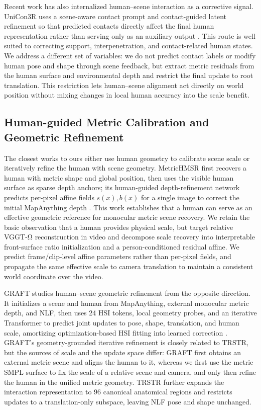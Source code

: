 \documentclass{article}
\begin{document}
Recent work has also internalized human--scene interaction as a corrective signal. UniCon3R uses a scene-aware contact prompt and contact-guided latent refinement so that predicted contacts directly affect the final human representation rather than serving only as an auxiliary output \citep{sur2026unicon3r}. This route is well suited to correcting support, interpenetration, and contact-related human states. We address a different set of variables: we do not predict contact labels or modify human pose and shape through scene feedback, but extract metric residuals from the human surface and environmental depth and restrict the final update to root translation. This restriction lets human--scene alignment act directly on world position without mixing changes in local human accuracy into the scale benefit.

\subsection{Human-guided Metric Calibration and Geometric Refinement}

The closest works to ours either use human geometry to calibrate scene scale or iteratively refine the human with scene geometry. MetricHMSR first recovers a human with metric shape and global position, then uses the visible human surface as sparse depth anchors; its human-guided depth-refinement network predicts per-pixel affine fields $s(x),b(x)$ for a single image to correct the initial MapAnything depth \citep{song2026metrichmsr,keetha2025mapanything}. This work establishes that a human can serve as an effective geometric reference for monocular metric scene recovery. We retain the basic observation that a human provides physical scale, but target relative VGGT-Ω reconstruction in video and decompose scale recovery into interpretable front-surface ratio initialization and a person-conditioned residual affine. We predict frame/clip-level affine parameters rather than per-pixel fields, and propagate the same effective scale to camera translation to maintain a consistent world coordinate over the video.

GRAFT studies human--scene geometric refinement from the opposite direction. It initializes a scene and human from MapAnything, external monocular metric depth, and NLF, then uses 24 HSI tokens, local geometry probes, and an iterative Transformer to predict joint updates to pose, shape, translation, and human scale, amortizing optimization-based HSI fitting into learned correction \citep{ym2026graft,sarandi2024nlf}. GRAFT's geometry-grounded iterative refinement is closely related to TRSTR, but the sources of scale and the update space differ: GRAFT first obtains an external metric scene and aligns the human to it, whereas we first use the metric SMPL surface to fix the scale of a relative scene and camera, and only then refine the human in the unified metric geometry. TRSTR further expands the interaction representation to 96 canonical anatomical regions and restricts updates to a translation-only subspace, leaving NLF pose and shape unchanged.
\end{document}
